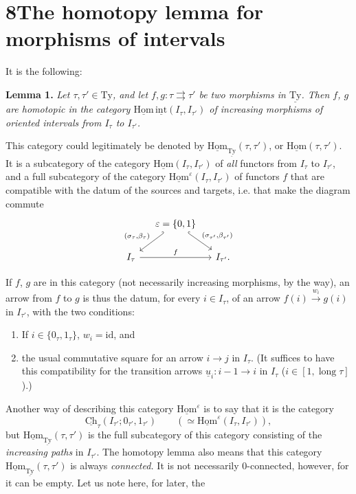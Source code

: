 \documentclass[11pt]{article}
\newcommand{\printedpage}[1]{\marginpar{\footnotesize p.~#1}}
\newcommand{\msp}[1]{\marginpar{\footnotesize [#1]}}
\newcommand{\uHom}{\underline{\mathrm{Hom}}}
\newcommand{\uTy}{\underline{\mathrm{Ty}}}
\newcommand{\ul}[1]{\underline{#1}}
\begin{document}
\printedpage{54}

\msp{page 83}

\section*{8\quad The homotopy lemma for morphisms of intervals}

It is the following:

\textbf{Lemma 1.} \textit{Let $\tau,\tau'\in\mathrm{Ty}$, and let $f,g:\tau\rightrightarrows\tau'$ be two morphisms in $\uTy$. Then $f$, $g$ are homotopic in the category $\uHom\,\underline{\mathrm{int}}(I_\tau,I_{\tau'})$ of increasing morphisms of oriented intervals from $I_\tau$ to $I_{\tau'}$.}

This category could legitimately be denoted by $\uHom_{\uTy}(\tau,\tau')$, or $\uHom(\tau,\tau')$. It is a subcategory of the category $\uHom(I_\tau,I_{\tau'})$ of \textit{all} functors from $I_\tau$ to $I_{\tau'}$, and a full subcategory of the category $\uHom^\varepsilon(I_\tau,I_{\tau'})$ of functors $f$ that are compatible with the datum of the sources and targets, i.e. that make the diagram commute
\[
\begin{tikzcd}[column sep=small]
 & \varepsilon=\{0,1\} \arrow[dl, hook', "{(\sigma_\tau,\beta_\tau)}"'] \arrow[dr, hook, "{(\sigma_{\tau'},\beta_{\tau'})}"] & \\
I_\tau \arrow[rr, "f"] & & I_{\tau'}.
\end{tikzcd}
\]

If $f$, $g$ are in this category (not necessarily increasing morphisms, by the way), an arrow from $f$ to $g$ is thus the datum, for every $i\in I_\tau$, of an arrow $f(i)\xrightarrow{w_i}g(i)$ in $I_{\tau'}$, with the two conditions:

\begin{enumerate}[label={}, leftmargin=*]
\item[a)] If $i\in\{0_\tau,1_\tau\}$, $w_i=\mathrm{id}$, and
\item[b)] the usual commutative square for an arrow $i\longrightarrow j$ in $I_\tau$. (It suffices to have this compatibility for the transition arrows $\ul{u}_i:i-1\longrightarrow i$ in $I_\tau$ ($i\in[1,\operatorname{long}\tau]$).)
\end{enumerate}

Another way of describing this category $\uHom^\varepsilon$ is to say that it is the category
\msp{page 84}
\[
\underline{\mathrm{Ch}}_\tau(I_{\tau'};0_{\tau'},1_{\tau'})\qquad(\simeq\uHom^\varepsilon(I_\tau,I_{\tau'})),
\]
but $\uHom_{\uTy}(\tau,\tau')$ is the full subcategory of this category consisting of the \textit{increasing paths} in $I_{\tau'}$. The homotopy lemma also means that this category $\uHom_{\uTy}(\tau,\tau')$ is always \textit{connected.} It is not necessarily 0-connected, however, for it can be empty. Let us note here, for later, the
\end{document}
